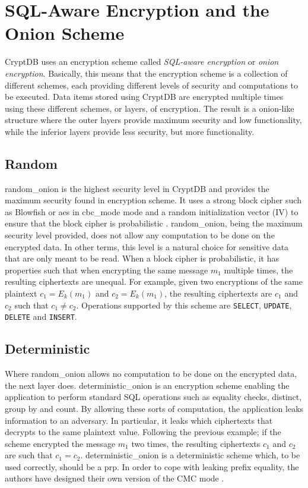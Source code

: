 \section{SQL-Aware Encryption and the Onion Scheme}

CryptDB uses an encryption scheme called \emph{SQL-aware encryption} or \textit{onion encryption}. Basically, this means that the encryption scheme is a collection of different schemes, each providing different levels of security and computations to be executed. Data items stored using CryptDB are encrypted multiple times using these different schemes, or layers, of encryption. The result is a onion-like structure where the outer layers provide maximum security and low functionality, while the inferior layers provide less security, but more functionality.


\subsection{Random}
\Gls{random_onion} is the highest security level in CryptDB and provides the maximum security found in encryption scheme. It uses a strong block cipher such as Blowfish or \Gls{aes} in \Gls{cbc_mode} mode and a random initialization vector (IV) to ensure that the block cipher is probabilistic \citep{CryptDB_Main_Paper}. \Gls{random_onion}, being the maximum security level provided, does not allow any computation to be done on the encrypted data. In other terms, this level is a natural choice for sensitive data that are only meant to be read. When a block cipher is probabilistic, it has properties such that when encrypting the same message $m_1$ multiple times, the resulting ciphertexts are unequal. For example, given two encryptions of the same plaintext $c_1 = E_k(m_1)$ and $c_2 = E_k(m_1)$, the resulting ciphertexts are $c_1$ and $c_2$ such that $c_1 \neq c_2$. Operations supported by this scheme are \verb!SELECT!, \verb!UPDATE!, \verb!DELETE! and \verb!INSERT!.


\subsection{Deterministic}
Where \Gls{random_onion} allows no computation to be done on the encrypted data, the next layer does. \Gls{deterministic_onion} is an encryption scheme enabling the application to perform standard SQL operations such as equality checks, distinct, group by and count. By allowing these sorts of computation, the application leaks information to an adversary. In particular, it leaks which ciphertexts that decrypts to the same plaintext value. Following the previous example; if the scheme encrypted the message $m_1$ two times, the resulting ciphertexts $c_1$ and $c_2$ are such that $c_1 = c_2$. \Gls{deterministic_onion} is a deterministic scheme which, to be used correctly, should be a \Gls{prp}. In order to cope with leaking prefix equality, the authors have designed their own version of the CMC mode \cite{CryptDB_Main_Paper}.


